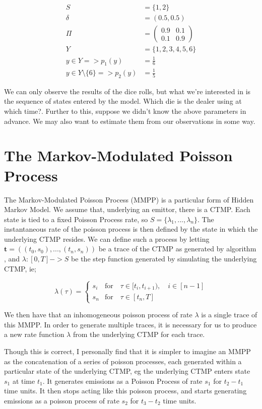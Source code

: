 \begin{align*}
S &= \{1,2\}\\
\delta &= (0.5,0.5)\\
\Pi &= 
\left(
	\begin{matrix}
	0.9 & 0.1 \\
	0.1 & 0.9
	\end{matrix}
\right)\\
Y &= \{1,2,3,4,5,6\}\\
y \in Y => p_1(y) &= \frac{1}{6}\\
y \in Y \setminus \{6\} => p_2(y) &= \frac{1}{5}
\end{align*}

We can only observe the results of the dice rolls, but what we're interested in is the sequence of states entered by the model. Which die is the dealer using at which time?. Further to this, suppose we didn't know the above parameters in advance. We may also want to estimate them from our observations in some way.

\section{The Markov-Modulated Poisson Process}

The Markov-Modulated Poisson Process (MMPP) is a particular form of Hidden Markov Model. We assume that, underlying an emittor, there is a CTMP. Each state is tied to a fixed Poisson Process rate, so $S = \{\lambda_1,...,\lambda_n\}$. The instantaneous rate of the poisson process is then defined by the state in which the underlying CTMP resides. We can define such a process by letting $\mathbf{t} = ((t_0,s_0),...,(t_n,s_n))$ be a trace of the CTMP as generated by algorithm \label{algctmp}
, and $\lambda : [0,T]->S$ be the step function generated by simulating the underlying CTMP, ie;

$$
\lambda(\tau) = 
\begin{cases}
	s_i & \mbox{for} \quad \tau \in [t_i,t_{i+1}), \quad i \in [n-1]\\
	s_n & \mbox{for} \quad \tau \in [t_n,T]
\end{cases}
$$

We then have that an inhomogeneous poisson process of rate $\lambda$ is a single trace of this MMPP. In order to generate multiple traces, it is necessary for us to produce a new rate function $\lambda$ from the underlying CTMP for each trace.

Though this is correct, I personally find that it is simpler to imagine an MMPP as the concatenation of a series of poisson processes, each generated within a particular state of the underlying CTMP, eg the underlying CTMP enters state $s_1$ at time $t_1$. It generates emissions as a Poisson Process of rate $s_1$ for $t_2-t_1$ time units. It then stops acting like this poisson process, and starts generating emissions as a poisson process of rate $s_2$ for $t_3-t_2$ time units.

